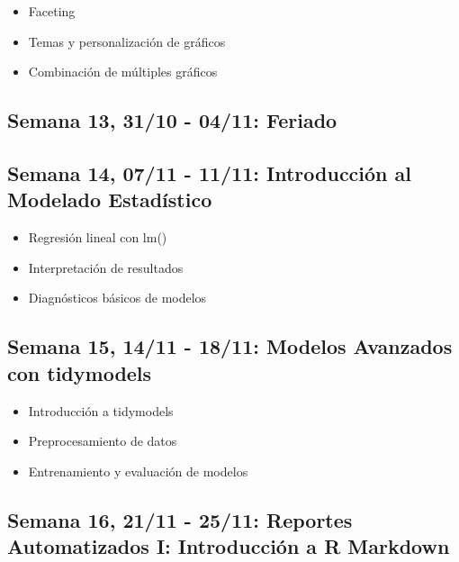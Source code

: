 \documentclass[11pt,letter,]{article}
\providecommand{\tightlist}{%
  \setlength{\itemsep}{0pt}\setlength{\parskip}{0pt}}
\begin{document}
\begin{itemize}
\tightlist
\item
  Faceting
\item
  Temas y personalización de gráficos
\item
  Combinación de múltiples gráficos
\end{itemize}

\hypertarget{semana-13-3110---0411-feriado}{%
\subsection{Semana 13, 31/10 - 04/11:
Feriado}\label{semana-13-3110---0411-feriado}}

\hypertarget{semana-14-0711---1111-introducciuxf3n-al-modelado-estaduxedstico}{%
\subsection{Semana 14, 07/11 - 11/11: Introducción al Modelado
Estadístico}\label{semana-14-0711---1111-introducciuxf3n-al-modelado-estaduxedstico}}

\begin{itemize}
\tightlist
\item
  Regresión lineal con lm()
\item
  Interpretación de resultados
\item
  Diagnósticos básicos de modelos
\end{itemize}

\hypertarget{semana-15-1411---1811-modelos-avanzados-con-tidymodels}{%
\subsection{Semana 15, 14/11 - 18/11: Modelos Avanzados con
tidymodels}\label{semana-15-1411---1811-modelos-avanzados-con-tidymodels}}

\begin{itemize}
\tightlist
\item
  Introducción a tidymodels
\item
  Preprocesamiento de datos
\item
  Entrenamiento y evaluación de modelos
\end{itemize}

\hypertarget{semana-16-2111---2511-reportes-automatizados-i-introducciuxf3n-a-r-markdown}{%
\subsection{Semana 16, 21/11 - 25/11: Reportes Automatizados I:
Introducción a R
Markdown}\label{semana-16-2111---2511-reportes-automatizados-i-introducciuxf3n-a-r-markdown}}
\end{document}
